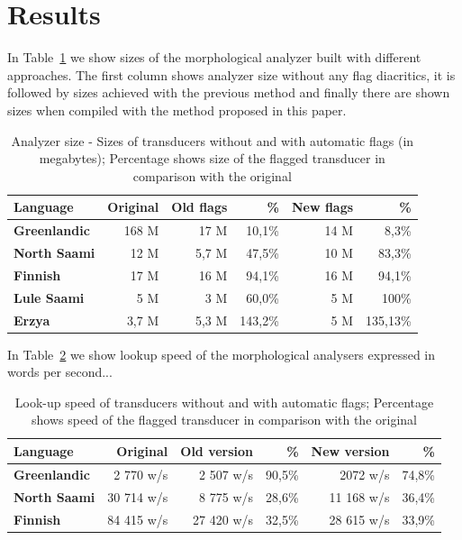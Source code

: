 \documentclass[11pt]{article}
\begin{document}
\section{Results}
In Table~\ref{table:sizes} we show sizes of the morphological analyzer built with different approaches. The first column shows analyzer 
size without any flag diacritics, it is followed by sizes achieved with the previous method and finally there are shown sizes when 
compiled with the method proposed in this paper.
\begin{table}
    \centering
    \begin{tabular}{|l|r|r|r|r|r|}
        \hline
        \bf Language & \bf Original & \bf Old flags  & \bf \% & \bf New flags  & \bf \% \\
        \hline\hline
        \bf Greenlandic &   168 M  & 17 M & 10,1\% &  14 M & 8,3\% \\
        \bf North Saami &   12 M    & 5,7 M & 47,5\% & 10 M & 83,3\% \\
        \bf Finnish &   17 M    & 16 M & 94,1\% & 16 M & 94,1\% \\
        \bf Lule Saami  &   5 M    & 3 M & 60,0\% & 5 M & 100\% \\
        \bf Erzya       &   3,7 M    & 5,3 M & 143,2\% &  5 M & 135,13\% \\
        \hline
    \end{tabular}
    \caption{Analyzer size - Sizes of transducers without and with automatic flags (in megabytes); Percentage shows size of the flagged transducer in comparison with the original
    \label{table:sizes}}
\end{table}

In Table~\ref{table:lookup} we show lookup speed of the morphological analysers expressed in words per second...

\begin{table}[h]
 \centering
    \begin{tabular}{|l|r|r|r|r|r|}
        \hline
        \bf Language & \bf Original & \bf Old version & \bf \% & \bf New version & \bf \% \\
        \hline\hline
        \bf Greenlandic & 2 770 w/s & 2 507 w/s & 90,5\% & 2072 w/s & 74,8\%  \\
        \bf North Saami & 30 714 w/s & 8 775 w/s & 28,6\% & 11 168 w/s & 36,4\%  \\
        \bf Finnish  & 84 415 w/s & 27 420 w/s & 32,5\%  & 28 615 w/s & 33,9\%  \\
        \hline
    \end{tabular}
    \caption{Look-up speed of transducers without and with automatic flags; Percentage shows speed of the flagged transducer in comparison with the original
    \label{table:lookup}}
\end{table}
\end{document}
